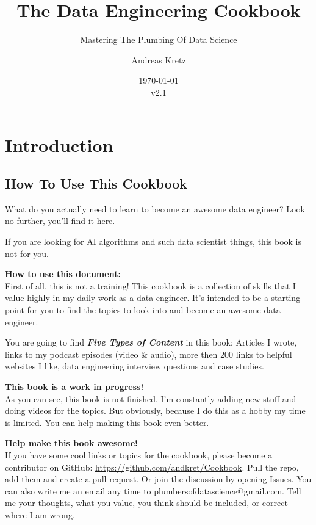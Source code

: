\documentclass[12pt, numbers=noenddot]{scrreprt} %
\title{The Data Engineering Cookbook}
\subtitle{Mastering The Plumbing Of Data Science}
\author{Andreas Kretz}
\date{\today\\v2.1}
\begin{document}
\maketitle


\pagebreak

\setcounter{tocdepth}{3}
\tableofcontents

\pagebreak

\part{Introduction}
\chapter{How To Use This Cookbook}
What do you actually need to learn to become an awesome data engineer?
Look no further, you'll find it here. 

If you are looking for AI algorithms and such data scientist things, this book is not for you.

\textbf{How to use this document:} \\ 
First of all, this is not a training! This cookbook is a collection of skills that I value highly in my daily work as a data engineer. It's intended to be a starting point for you to find the topics to look into and become an awesome data engineer.

You are going to find \textbf{\textit{Five Types of Content}} in this book: Articles I wrote, links to my podcast episodes (video \& audio), more then 200 links to helpful websites I like, data engineering interview questions and case studies. 

\textbf{This book is a work in progress!} \\
As you can see, this book is not finished. I'm constantly adding new stuff and doing videos for the topics. But obviously, because I do this as a hobby my time is limited. You can help making this book even better.

\textbf{Help make this book awesome!}\\
If you have some cool links or topics for the cookbook, please become a contributor on GitHub: \url{https://github.com/andkret/Cookbook}. Pull the repo, add them and create a pull request. Or join the discussion by opening Issues.
You can also write me an email any time to plumbersofdatascience@gmail.com. Tell me your thoughts, what you value, you think should be included, or correct where I am wrong.
\end{document}
